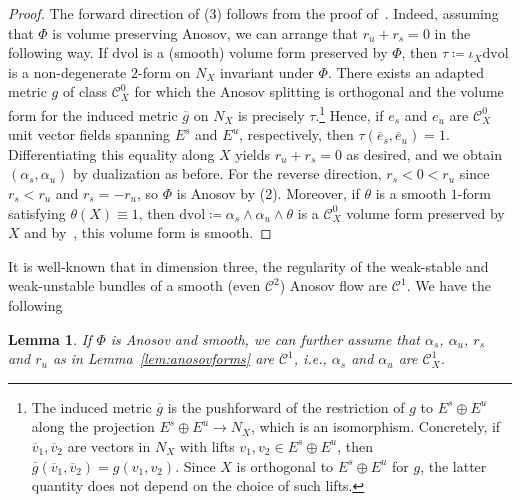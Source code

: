 \documentclass[letterpaper, 11pt]{article}
\numberwithin{equation}{section}
\newtheorem{lem}[thm]{Lemma}
\begin{document}
\begin{proof}
The forward direction of (3) follows from the proof of~\cite[Theorem 3]{M95}. Indeed, assuming that $\Phi$ is volume preserving Anosov, we can arrange that $r_u + r_s = 0$ in the following way. If $\mathrm{dvol}$ is a (smooth) volume form preserved by $\Phi$, then $\tau \coloneqq \iota_X \mathrm{dvol}$ is a non-degenerate $2$-form on $N_X$ invariant under $\Phi$. There exists an adapted metric $g$ of class $\mathcal{C}^0_X$ for which the Anosov splitting is orthogonal and the volume form for the induced metric $\overline{g}$ on $N_X$ is precisely $\tau$.\footnote{The induced metric $\overline{g}$ is the pushforward of the restriction of $g$ to $E^s \oplus E^u$ along the projection $E^s \oplus E^u \rightarrow N_X$, which is an isomorphism. Concretely, if $\overline{v}_1, \overline{v}_2$ are vectors in $N_X$ with lifts $v_1, v_2 \in E^s \oplus E^u$, then $\overline{g}(\overline{v}_1, \overline{v}_2) = g(v_1, v_2)$. Since $X$ is orthogonal to $E^s \oplus E^u$ for $g$, the latter quantity does not depend on the choice of such lifts.} Hence, if $e_s$ and $e_u$ are $\mathcal{C}^0_X$ unit vector fields spanning $E^s$ and $E^u$, respectively, then $\tau (\overline{e}_s, \overline{e}_u) = 1$. Differentiating this equality along $X$ yields $r_u + r_s = 0$ as desired, and we obtain $(\alpha_s, \alpha_u)$ by dualization as before. For the reverse direction, $r_s < 0 < r_u$ since $r_s < r_u$ and $r_s = -r_u$, so $\Phi$ is Anosov by (2). Moreover, if $\theta$ is a smooth $1$-form satisfying $\theta(X) \equiv 1$, then $\mathrm{dvol} \coloneqq \alpha_s \wedge \alpha_u \wedge \theta$ is a $\mathcal{C}^0_X$ volume form preserved by $X$ and by~\cite[Corollary 2.1]{LMM}, this volume form is smooth.
\end{proof}

It is well-known that in dimension three, the regularity of the weak-stable and weak-unstable bundles of a smooth (even $\mathcal{C}^2$) Anosov flow are $\mathcal{C}^1$. We have the following

\begin{lem} \label{lem:c1}
If $\Phi$ is Anosov and smooth, we can further assume that $\alpha_s$, $\alpha_u$, $r_s$ and $r_u$ as in Lemma~\ref{lem:anosovforms} are $\mathcal{C}^1$, i.e., $\alpha_s$ and $\alpha_u$ are $\mathcal{C}^1_X$.
\end{lem}
\end{document}
